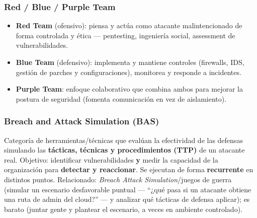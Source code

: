 \documentclass[../main.tex]{subfiles}
\begin{document}
\subsubsection{Red / Blue / Purple Team}
\begin{itemize}
  \item \textbf{Red Team} (ofensivo): piensa y actúa como atacante
    malintencionado de forma controlada y ética --- pentesting, ingeniería
    social, assessment de vulnerabilidades.
  \item \textbf{Blue Team} (defensivo): implementa y mantiene controles
    (firewalls, IDS, gestión de parches y configuraciones), monitorea y responde
    a incidentes.
  \item \textbf{Purple Team}: enfoque colaborativo que combina ambos para
    mejorar la postura de seguridad (fomenta comunicación en vez de aislamiento).
\end{itemize}

\subsubsection{Breach and Attack Simulation (BAS)}
Categoría de herramientas/técnicas que evalúan la efectividad de las defensas
simulando las \textbf{tácticas, técnicas y procedimientos (TTP)} de un atacante
real. Objetivo: identificar vulnerabilidades \textbf{y} medir la capacidad de la
organización para \textbf{detectar y reaccionar}. Se ejecutan de forma
\textbf{recurrente} en distintos puntos. Relacionado: \emph{Breach Attack
Simulation}/juegos de guerra (simular un escenario desfavorable puntual ---
``¿qué pasa si un atacante obtiene una ruta de admin del cloud?'' --- y analizar
qué tácticas de defensa aplicar); es barato (juntar gente y plantear el
escenario, a veces en ambiente controlado).
\end{document}

